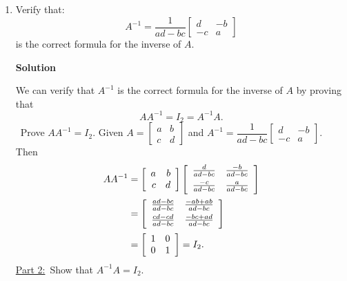 \begin{enumerate}
\item Verify that: $$A^{-1}=\frac{1}{ad-bc}\left [
\begin{array}{rr} d&-b\\-c&a \end{array} \right ]$$ is the
correct formula for the inverse of $A$.

\noindent \textbf{Solution}

\noindent We can verify that $A^{-1}$ is the correct formula for
the inverse of $A$ by proving that $$AA^{-1}=I_{2}=A^{-1}A.$$
\ Prove $AA^{-1}=I_{2}$. \newline
Given $A= \left [\begin{array}{rr}a&b\\c&d \end{array} \right]$
and $A^{-1}=\dfrac{1}{ad-bc}
\left [\begin{array}{rr}d&-b\\-c&a\end{array} \right ]$. Then
\begin{align*}
AA^{-1} &= \left[\begin{array}{rr}
                         a&b\\
                         c&d \end{array} \right]
\left [\begin{array}{rr}\vspace{1mm}
                       \frac{d}{ad-bc}&\frac{-b}{ad-bc}\\ \vspace{1mm}
                      \frac{-c}{ad-bc}&\frac{a}{ad-bc} \end{array} \right]\\
&= \left[ \begin{array}{rr} \vspace{1mm}
                         \frac{ad-bc}{ad-bc}&\frac{-ab+ab}{ad-bc}\\ \vspace{1mm}
                         \frac{cd-cd}{ad-bc}&\frac{-bc+ad}{ad-bc} \end{array} \right] \\
&= \left[ \begin{array}{rr}
                        1&0\\
                        0&1 \end{array} \right]=I_{2}.
\end{align*}
{\underline{Part 2:}}\ Show that $A^{-1}A=I_{2}$.

\end{enumerate}
